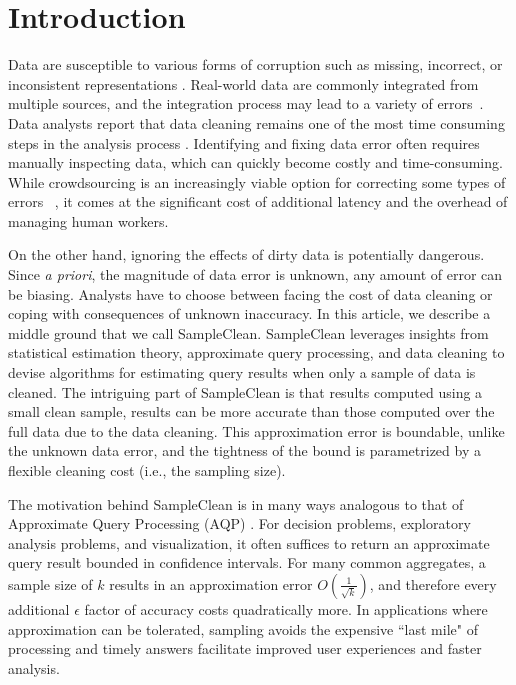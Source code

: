 \section{Introduction}
Data are susceptible to various forms of corruption such as missing,
incorrect, or inconsistent representations \cite{Gartner}.
Real-world data are commonly integrated from multiple sources, and the integration process may lead to a variety of errors~\cite{DBLP:journals/pvldb/DongS13}. 
Data analysts report that data cleaning remains one of the most time
consuming steps in the analysis process \cite{nytimes}.
Identifying and fixing data error often requires manually inspecting data, which can quickly become costly and time-consuming. 
While crowdsourcing is an increasingly viable option for correcting some types of errors ~\cite{DBLP:conf/sigmod/JefferyFH08,DBLP:journals/pvldb/FanLMTY10,DBLP:journals/pvldb/YakoutENOI11, gokhale2014corleone, park2014crowdfill, sampleclean,chu2015katara}, it comes at the significant cost of additional latency and the overhead of managing human workers. 

On the other hand, ignoring the effects of dirty data is potentially dangerous.
Since \emph{a priori}, the magnitude of data error is unknown, any amount of error can be biasing.
Analysts have to choose between facing the cost of data cleaning
or coping with consequences of unknown inaccuracy.
In this article, we describe a middle ground that we call SampleClean.
SampleClean leverages insights from statistical estimation theory, approximate query processing, and data cleaning to devise algorithms for estimating query results when
only a sample of data is cleaned.
The intriguing part of SampleClean is that results computed using a small clean sample,                                   
results can be more accurate than those computed over the full data due to the data cleaning.
This approximation error is boundable, unlike the unknown data error, and the tightness of the bound is parametrized by a flexible cleaning cost (i.e., the sampling size).

The motivation behind SampleClean is in many ways analogous to that of Approximate Query Processing (AQP) \cite{DBLP:conf/icde/OlkenR92, olken1993random, garofalakis2001approximate, DBLP:conf/eurosys/AgarwalMPMMS13}.
For decision problems, exploratory analysis problems, and visualization, it often suffices to return an approximate query result bounded in confidence intervals.
For many common aggregates, a sample size of $k$ results in an approximation error $O(\frac{1}{\sqrt{k}})$, and therefore every additional $\epsilon$ factor of accuracy costs quadratically more. 
In applications where approximation can be tolerated, sampling avoids the expensive ``last mile" of processing and timely answers facilitate improved user experiences and faster analysis.

